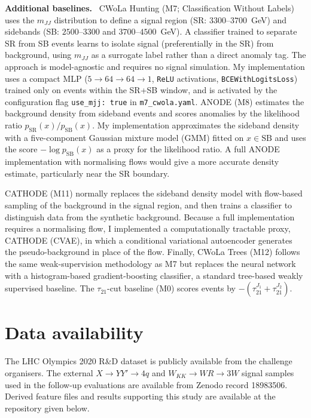\documentclass[11pt,a4paper]{article}
\newcommand{\runin}[1]{\par\vspace{2pt}\textbf{#1.}\ }
\newcommand{\mjj}{m_{JJ}}
\newcommand{\tautwo}{\tau_{21}}
\newcommand{\code}[1]{\texttt{#1}}
\begin{document}
\runin{Additional baselines}
CWoLa Hunting\cite{Metodiev2017,Collins2018,Collins2019} (M7; Classification Without Labels) uses the
$\mjj$ distribution to define a signal region (SR: $3300$--$3700$~GeV)
and sidebands (SB: $2500$--$3300$ and $3700$--$4500$~GeV). A
classifier trained to separate SR from SB events learns to isolate signal
(preferentially in the SR) from background, using $\mjj$ as a
surrogate label rather than a direct anomaly tag. The approach is
model-agnostic and requires no signal simulation. My implementation
uses a compact MLP ($5 \to 64 \to 64 \to 1$, \code{ReLU} activations,
\code{BCEWithLogitsLoss}) trained only on events within the SR+SB window,
and is activated by the configuration flag \code{use\_mjj: true} in
\code{m7\_cwola.yaml}. ANODE\cite{Nachman2020} (M8) estimates the
background density from sideband events and scores anomalies by the
likelihood ratio $p_{\mathrm{SR}}(x)/p_{\mathrm{SB}}(x)$. My implementation
approximates the sideband density with a five-component Gaussian mixture
model (GMM) fitted on $x \in \mathrm{SB}$ and uses the score
$-\log p_{\mathrm{SB}}(x)$ as a proxy for the likelihood ratio. A full ANODE
implementation with normalising flows\cite{Papamakarios2021} would give a
more accurate density estimate, particularly near the SR boundary.

CATHODE\cite{Hallin2022} (M11) normally replaces the sideband density model with flow-based
sampling of the background in the signal region, and then trains a classifier to distinguish
data from the synthetic background. Because a full implementation requires a normalising flow, I
implemented a computationally tractable proxy, CATHODE (CVAE), in which a conditional variational
autoencoder\cite{Sohn2015,KingmaWelling2014} generates the pseudo-background in place of the flow.
Finally, CWoLa Trees (M12) follows the same weak-supervision methodology as M7 but replaces the
neural network with a histogram-based gradient-boosting classifier,\cite{Pedregosa2011} a standard
tree-based weakly supervised baseline.\cite{Finke2024}
The $\tautwo$-cut baseline (M0) scores events by $-(\tautwo^{J_1}+\tautwo^{J_2})$.

\section*{Data availability}
The LHC Olympics 2020 R\&D dataset is publicly available from the challenge organisers.\cite{Kasieczka2021,Kasieczka2019data}
The external $X\to YY'\to4q$ and $W_{KK}\to WR\to3W$ signal samples used in the follow-up evaluations are available from Zenodo record 18983506.\cite{AdditionalSignals2026}
Derived feature files and results supporting this study are available at the repository given below.
\end{document}
